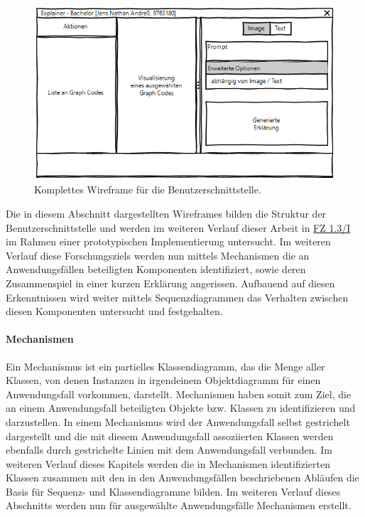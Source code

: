 \begin{figure}[htb]
    \centering
    \includegraphics[width=\textwidth]{chapter/chapter_3/wireframe-complete-stage.png}
    \caption{Komplettes Wireframe für die Benutzerschnittstelle.}
    \label{sec3:model:par:wireframe:fig:complete-stage}
\end{figure}
Die in diesem Abschnitt dargestellten Wireframes bilden die Struktur der Benutzerschnittstelle und werden im weiteren Verlauf dieser Arbeit in \hyperref[sec4:impl:subsec:fz-explainability]{FZ 1.3/I} im Rahmen einer prototypischen Implementierung untersucht.
Im weiteren Verlauf diese Forschungsziels werden nun mittels Mechanismen die an Anwendungsfällen beteiligten Komponenten identifiziert, sowie deren Zusammenspiel in einer kurzen Erklärung angerissen.
Aufbauend auf diesen Erkenntnissen wird weiter mittels Sequenzdiagrammen das Verhalten zwischen diesen Komponenten untersucht und festgehalten.

\FloatBarrier

\paragraph{Mechanismen}
\label{sec3:model:par:mechanism-use-cases}
Ein Mechanismus ist ein partielles Klassendiagramm, das die Menge aller Klassen, von denen Instanzen in irgendeinem Objektdiagramm für einen Anwendungsfall vorkommen, darstellt.
Mechanismen haben somit zum Ziel, die an einem Anwendungsfall beteiligten Objekte bzw. Klassen zu identifizieren und darzustellen.
In einem Mechanismus wird der Anwendungsfall selbst gestrichelt dargestellt und die mit diesem Anwendungsfall assoziierten Klassen werden ebenfalls durch gestrichelte Linien mit dem Anwendungsfall verbunden.
Im weiteren Verlauf dieses Kapitels werden die in Mechanismen identifizierten Klassen zusammen mit den in den Anwendungsfällen beschriebenen Abläufen die Basis für Sequenz- und Klassendiagramme bilden.
Im weiteren Verlauf dieses Abschnitts werden nun für ausgewählte Anwendungsfälle Mechanismen erstellt.

